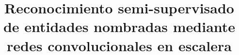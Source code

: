 \documentclass[12pt]{book}
\begin{document}









\title{Reconocimiento semi-supervisado de entidades nombradas mediante redes convolucionales en escalera}
\end{document}
